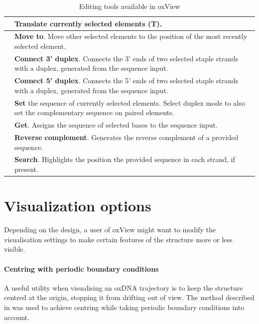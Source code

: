 \begin{table}[ht]
\begin{tabularx}{\textwidth} { >{\centering\arraybackslash}m{3em} | X }
 & \textbf{Translate} currently selected elements (T). \\ \hline
 & \textbf{Move to}. Move other selected elements to the position of the most recently selected element. \\ \hline
 & \textbf{Connect 3' duplex}. Connects the 3' ends of two selected staple strands with a duplex, generated from the sequence input. \\ \hline
 & \textbf{Connect 5' duplex}. Connects the 5' ends of two selected staple strands with a duplex, generated from the sequence input. \\ \hline
 & \textbf{Set} the sequence of currently selected elements. Select duplex mode to also set the complementary sequence on paired elements. \\ \hline
 & \textbf{Get}. Assigns the sequence of selected bases to the sequence input.  \\ \hline
 & \textbf{Reverse complement}. Generates the reverse complement of a provided sequence. \\ \hline
 & \textbf{Search}. Highlights the position the provided sequence in each strand, if present. \\ \hline
\end{tabularx}

\caption{Editing tools available in oxView}
\label{table:edit_tools}
\end{table}



\section{Visualization options}
Depending on the design, a user of oxView might want to modify the visualisation settings to make certain features of the structure more or less visible.

\paragraph{Centring with periodic boundary conditions} A useful utility when visualising an oxDNA trajectory is to keep the structure centred at the origin, stopping it from drifting out of view. The method described in \cite{PBC_centring} was used to achieve centring while taking periodic boundary conditions into account.

